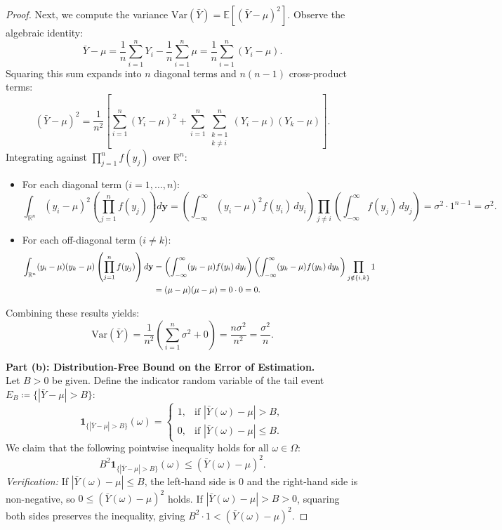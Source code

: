 \documentclass[11pt, letterpaper]{article}
\theoremstyle{definition}
\theoremstyle{remark}
\newcommand{\R}{\mathbb{R}}
\newcommand{\E}{\mathbb{E}}
\begin{document}
\begin{proof}
Next, we compute the variance $\text{Var}(\bar{Y}) = \E\left[(\bar{Y} - \mu)^2\right]$. Observe the algebraic identity:
\[
    \bar{Y} - \mu = \frac{1}{n} \sum_{i=1}^{n} Y_i - \frac{1}{n} \sum_{i=1}^{n} \mu = \frac{1}{n} \sum_{i=1}^{n} (Y_i - \mu).
\]
Squaring this sum expands into $n$ diagonal terms and $n(n-1)$ cross-product terms:
\[
    (\bar{Y} - \mu)^2 = \frac{1}{n^2} \left[ \sum_{i=1}^{n} (Y_i - \mu)^2 + \sum_{i=1}^{n} \sum_{\substack{k=1 \\ k \neq i}}^{n} (Y_i - \mu)(Y_k - \mu) \right].
\]
Integrating against $\prod_{j=1}^n f(y_j)$ over $\R^n$:
\begin{itemize}
    \item For each diagonal term ($i = 1, \dots, n$):
    \[
        \int_{\R^n} (y_i - \mu)^2 \left(\prod_{j=1}^{n} f(y_j)\right) d\mathbf{y} = \left(\int_{-\infty}^{\infty} (y_i - \mu)^2 f(y_i) \, dy_i\right) \prod_{j \neq i} \left(\int_{-\infty}^{\infty} f(y_j) \, dy_j\right) = \sigma^2 \cdot 1^{n-1} = \sigma^2.
    \]
    \item For each off-diagonal term ($i \neq k$):
    \begin{align*}
        \int_{\R^n} (y_i - \mu)(y_k - \mu) \left(\prod_{j=1}^{n} f(y_j)\right) d\mathbf{y} 
        &= \left(\int_{-\infty}^{\infty} (y_i - \mu) f(y_i) \, dy_i\right) \left(\int_{-\infty}^{\infty} (y_k - \mu) f(y_k) \, dy_k\right) \prod_{j \notin \{i, k\}} 1 \\ \relax
        &= (\mu - \mu)(\mu - \mu) = 0 \cdot 0 = 0.
    \end{align*}
\end{itemize}
Combining these results yields:
\[
    \text{Var}(\bar{Y}) = \frac{1}{n^2} \left( \sum_{i=1}^{n} \sigma^2 + 0 \right) = \frac{n\sigma^2}{n^2} = \frac{\sigma^2}{n}.
\]

\textbf{Part (b): Distribution-Free Bound on the Error of Estimation.} \\ \relax
Let $B > 0$ be given. Define the indicator random variable of the tail event $E_B \coloneqq \{|\bar{Y} - \mu| > B\}$:
\[
    \mathbf{1}_{\{|\bar{Y} - \mu| > B\}}(\omega) = \begin{cases} 1, & \text{if } |\bar{Y}(\omega) - \mu| > B, \\ 0, & \text{if } |\bar{Y}(\omega) - \mu| \le B. \end{cases}
\]
We claim that the following pointwise inequality holds for all $\omega \in \Omega$:
\[
    B^2 \mathbf{1}_{\{|\bar{Y} - \mu| > B\}}(\omega) \le \left(\bar{Y}(\omega) - \mu\right)^2.
\]
\emph{Verification:} If $|\bar{Y}(\omega) - \mu| \le B$, the left-hand side is $0$ and the right-hand side is non-negative, so $0 \le (\bar{Y}(\omega) - \mu)^2$ holds. If $|\bar{Y}(\omega) - \mu| > B > 0$, squaring both sides preserves the inequality, giving $B^2 \cdot 1 < (\bar{Y}(\omega) - \mu)^2$.


\end{proof}
\end{document}
